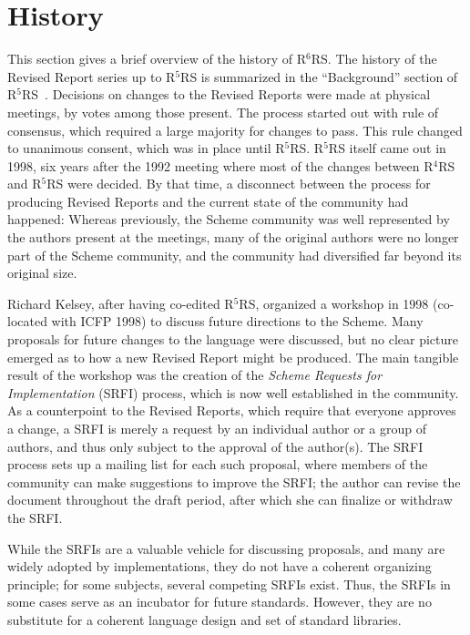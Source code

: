 \documentclass{sigplanconf}
\newcommand{\rn}[1]{R$^{#1}$RS}
\begin{document}
\section{History}
\label{sec:history}

This section gives a brief overview of the history of \rn{6}.  The
history of the Revised Report series up to \rn{5} is summarized in the
``Background'' section of \rn{5}~\cite{R5RS}.  Decisions on changes to
the Revised Reports were made at physical meetings, by votes among
those present.  The process started out with rule of consensus, which
required a large majority for changes to pass.  This rule changed to
unanimous consent, which was in place until \rn{5}.  \rn{5} itself
came out in 1998, six years after the 1992 meeting where most of the
changes between \rn{4} and \rn{5} were decided.  By that time, a
disconnect between the process for producing Revised Reports and the
current state of the community had happened: Whereas previously, the
Scheme community was well represented by the authors present at the
meetings, many of the original authors were no longer part of the
Scheme community, and the community had diversified far beyond its
original size.

Richard Kelsey, after having co-edited \rn{5}, organized a workshop in
1998 (co-located with ICFP 1998) to discuss future directions to the
Scheme.  Many proposals for future changes to the language were
discussed, but no clear picture emerged as to how a new Revised Report
might be produced. The main tangible result of the workshop was the
creation of the \textit{Scheme Requests for Implementation} (SRFI)
process, which is now well established in the community.  As a
counterpoint to the Revised Reports, which require that everyone
approves a change, a SRFI is merely a request by an individual author
or a group of authors, and thus only subject to the approval of the
author(s).  The SRFI process sets up a mailing list for each such
proposal, where members of the community can make suggestions to
improve the SRFI; the author can revise the document throughout the
draft period, after which she can finalize or withdraw the SRFI.

While the SRFIs are a valuable vehicle for discussing proposals, and
many are widely adopted by implementations, they do not have a
coherent organizing principle; for some subjects, several competing
SRFIs exist.  Thus, the SRFIs in some cases serve as an incubator for
future standards.  However, they are no substitute for a coherent
language design and set of standard libraries.
\end{document}
